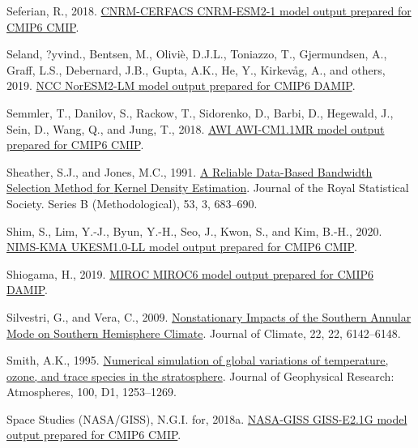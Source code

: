 \documentclass[12pt,oneside]{reedthesis}
\newlength{\cslhangindent}
\newenvironment{CSLReferences}[2] %
 {%
  \setlength{\parindent}{0pt}
  \ifodd #1 \everypar{\setlength{\hangindent}{\cslhangindent}}\ignorespaces\fi
  \ifnum #2 > 0
  \setlength{\parskip}{#2\baselineskip}
  \fi
 }%
 {}
\begin{document}
\begin{CSLReferences}{1}{0}
\leavevmode{}%
Seferian, R., 2018. \href{https://doi.org/10.22033/ESGF/CMIP6.1391}{CNRM-CERFACS CNRM-ESM2-1 model output prepared for CMIP6 CMIP}.

\leavevmode{}%
Seland, ?yvind., Bentsen, M., Oliviè, D.J.L., Toniazzo, T., Gjermundsen, A., Graff, L.S., Debernard, J.B., Gupta, A.K., He, Y., Kirkevåg, A., and others, 2019. \href{https://doi.org/10.22033/ESGF/CMIP6.580}{NCC NorESM2-LM model output prepared for CMIP6 DAMIP}.

\leavevmode{}%
Semmler, T., Danilov, S., Rackow, T., Sidorenko, D., Barbi, D., Hegewald, J., Sein, D., Wang, Q., and Jung, T., 2018. \href{https://doi.org/10.22033/ESGF/CMIP6.359}{AWI AWI-CM1.1MR model output prepared for CMIP6 CMIP}.

\leavevmode{}%
Sheather, S.J., and Jones, M.C., 1991. \href{https://www.jstor.org/stable/2345597}{A {Reliable Data-Based Bandwidth Selection Method} for {Kernel Density Estimation}}. Journal of the Royal Statistical Society. Series B (Methodological), 53, 3, 683--690.

\leavevmode{}%
Shim, S., Lim, Y.-J., Byun, Y.-H., Seo, J., Kwon, S., and Kim, B.-H., 2020. \href{https://doi.org/10.22033/ESGF/CMIP6.2245}{NIMS-KMA UKESM1.0-LL model output prepared for CMIP6 CMIP}.

\leavevmode{}%
Shiogama, H., 2019. \href{https://doi.org/10.22033/ESGF/CMIP6.894}{MIROC MIROC6 model output prepared for CMIP6 DAMIP}.

\leavevmode{}%
Silvestri, G., and Vera, C., 2009. \href{https://doi.org/10.1175/2009JCLI3036.1}{Nonstationary {Impacts} of the {Southern Annular Mode} on {Southern Hemisphere Climate}}. Journal of Climate, 22, 22, 6142--6148.

\leavevmode{}%
Smith, A.K., 1995. \href{https://doi.org/10.1029/94JD02395}{Numerical simulation of global variations of temperature, ozone, and trace species in the stratosphere}. Journal of Geophysical Research: Atmospheres, 100, D1, 1253--1269.

\leavevmode{}%
Space Studies (NASA/GISS), N.G.I. for, 2018a. \href{https://doi.org/10.22033/ESGF/CMIP6.1400}{NASA-GISS GISS-E2.1G model output prepared for CMIP6 CMIP}.


\end{CSLReferences}
\end{document}
